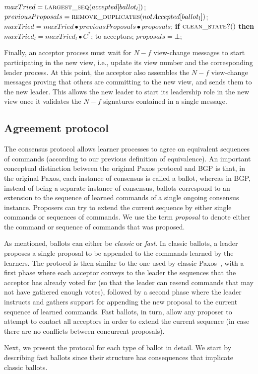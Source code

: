\begin{algorithm}
\begin{algorithmic}[1]
		\State
		\State $maxTried = \Call{largest\_seq}{accepted[ballot_l]}$;
		\State $previousProposals = \Call{remove\_duplicates}{notAccepted[ballot_l]}$;
		\State $maxTried = maxTried \bullet previousProposals \bullet proposals$;
		\State \textbf{if} $\Call{clean\_state?}{ }$ \textbf{then}
		\State \hspace{\algorithmicindent} $maxTried_l = maxTried_l \bullet C^*$;
		\State {} to acceptors;
		\State $proposals = \bot$;
		\EndFunction
		
	\end{algorithmic}
\end{algorithm}

Finally, an acceptor process must wait for $N-f$ view-change messages to start participating in the new view, i.e., update its view number and the corresponding leader process. At this point, the acceptor also assembles the $N-f$ view-change messages proving that others are committing to the new view, and sends them to the new leader. This allows the new leader to start its leadership role in the new view once it validates the $N-f$ signatures contained in a single message.

\subsection{Agreement protocol} 

The consensus protocol allows learner processes to agree on equivalent sequences of commands (according to our previous definition of equivalence). An important conceptual distinction between the original Paxos protocol and BGP is that, in the original Paxos, each instance of consensus is called a ballot, whereas in BGP, instead of being a separate instance of consensus, ballots correspond to an extension to the sequence of learned commands of a single ongoing consensus instance. Proposers can try to extend the current sequence by either single commands or sequences of commands. We use the term \textit{proposal} to denote either the command or sequence of commands that was proposed.\par
As mentioned, ballots can either be \textit{classic} or \textit{fast}. In classic ballots, a leader proposes a single proposal to be appended to the commands learned by the learners. The protocol is then similar to the one used by classic Paxos~\cite{Lam98}, with a first phase where each acceptor conveys to the leader the sequences that the acceptor has already voted for (so that the leader can resend commands that may not have gathered enough votes), followed by a second phase where the leader instructs and gathers support for appending the new proposal to the current sequence of learned commands. Fast ballots, in turn, allow any proposer to attempt to contact all acceptors in order to extend the current sequence (in case there are no conflicts between concurrent proposals).\par
Next, we present the protocol for each type of ballot in detail. We start by describing fast ballots since their structure has consequences that implicate classic ballots.

